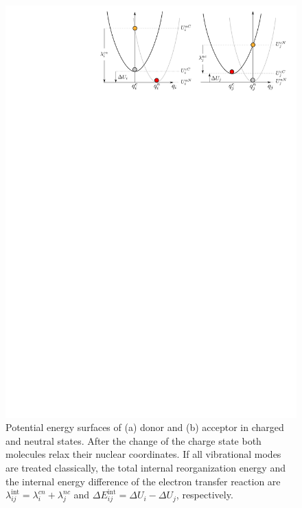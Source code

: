 \begin{figure}
   \centering
   
\includegraphics[width=0.6\linewidth]{
fig/reorganization_energy/monomer_parabolas}
    \caption{Potential energy surfaces of (a) donor and (b) acceptor in charged 
and neutral states. After the change of the charge state both molecules relax 
their nuclear coordinates. If all vibrational modes are treated classically, the 
total internal reorganization energy and the internal energy difference of the 
electron transfer reaction are $\lambda_{ij}^\text{int} = \lambda_{i}^{cn} + 
\lambda_{j}^{nc}$ and $\Delta E_{ij}^\text{int} =  \Delta U_i - \Delta U_j$, 
respectively.}
   \label{fig:parabolas}
\end{figure}


